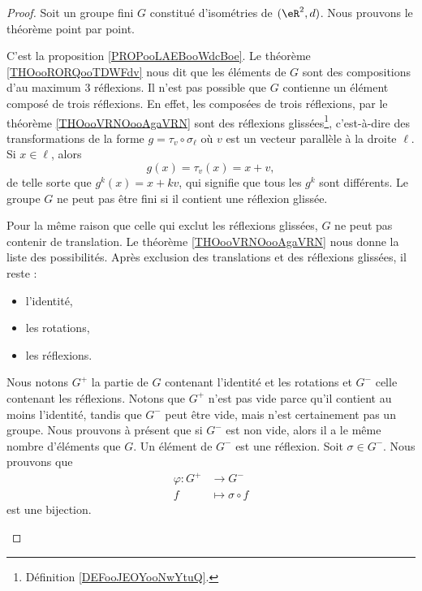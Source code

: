 \begin{proof}
	Soit un groupe fini \( G\) constitué d'isométries de \( (\eR^2,d)\). Nous prouvons le théorème point par point.
	\begin{subproof}
		C'est la proposition \ref{PROPooLAEBooWdcBoe}.
		Le théorème \ref{THOooRORQooTDWFdv} nous dit que les éléments de \( G\) sont des compositions d'au maximum \( 3\) réflexions.
		Il n'est pas possible que \( G\) contienne un élément composé de trois réflexions. En effet, les composées de trois réflexions, par le théorème \ref{THOooVRNOooAgaVRN} sont des réflexions glissées\footnote{Définition \ref{DEFooJEOYooNwYtuQ}.}, c'est-à-dire des transformations de la forme \( g=\tau_v\circ \sigma_{\ell}\) où \( v\) est un vecteur parallèle à la droite \( \ell\). Si \( x\in \ell\), alors
		\begin{equation}
			g(x)=\tau_v(x)=x+v,
		\end{equation}
		de telle sorte que \( g^k(x)=x+kv\), qui signifie que tous les \( g^k\) sont différents. Le groupe \( G\) ne peut pas être fini si il contient une réflexion glissée.

		\spitem[\( G^+\) et \( G^-\)]
		Pour la même raison que celle qui exclut les réflexions glissées, \( G\) ne peut pas contenir de translation. Le théorème \ref{THOooVRNOooAgaVRN} nous donne la liste des possibilités. Après exclusion des translations et des réflexions glissées, il reste :
		\begin{itemize}
			\item l'identité,
			\item les rotations,
			\item les réflexions.
		\end{itemize}
		Nous notons \( G^+\) la partie de \( G\) contenant l'identité et les rotations et \( G^-\) celle contenant les réflexions. Notons que \( G^+\) n'est pas vide parce qu'il contient au moins l'identité, tandis que \( G^-\) peut être vide, mais n'est certainement pas un groupe.
		Nous prouvons à présent que si \( G^-\) est non vide, alors il a le même nombre d'éléments que \( G\). Un élément de \( G^-\) est une réflexion. Soit \( \sigma\in G^-\). Nous prouvons que
		\begin{equation}        \label{EQooWRVVooBQCtPg}
			\begin{aligned}
				\varphi\colon G^+ & \to G^-               \\
				f                 & \mapsto \sigma\circ f
			\end{aligned}
		\end{equation}
		est une bijection.


\end{subproof}
\end{proof}
